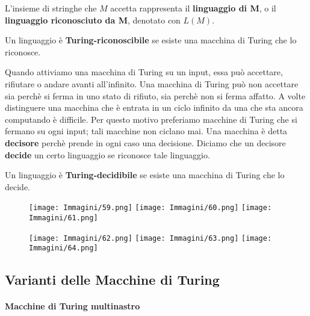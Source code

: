\documentclass{article}
\begin{document}
L'insieme di stringhe che $M$ accetta rappresenta il \textbf{linguaggio di M}, o il \textbf{linguaggio riconosciuto da M}, denotato con $L(M)$.

\begin{tcolorbox}[colback=yellow!10!white, colframe=yellow!50!black, title=Definizione 3.5]
    Un linguaggio è \textbf{Turing-riconoscibile} se esiste una macchina di Turing che lo riconosce.
\end{tcolorbox}

Quando attiviamo una macchina di Turing su un input, essa può accettare, rifiutare o andare avanti all'infinito.
Una macchina di Turing può non accettare sia perchè si ferma in uno stato di rifiuto, sia perchè non si ferma affatto.
A volte distinguere una macchina che è entrata in un ciclo infinito da una che sta ancora computando è difficile.
Per questo motivo preferiamo macchine di Turing che si fermano su ogni input; tali macchine non ciclano mai.
Una macchina è detta \textbf{decisore} perchè prende in ogni caso una decisione.
Diciamo che un decisore \textbf{decide} un certo linguaggio se riconosce tale linguaggio.

\begin{tcolorbox}[colback=green!10!white, colframe=green!50!black, title=Definizione 3.6]
    Un linguaggio è \textbf{Turing-decidibile} se esiste una macchina di Turing che lo decide.
\end{tcolorbox}

\begin{figure}[H]
    \centering
    \texttt{[image: Immagini/59.png]}
    \texttt{[image: Immagini/60.png]}
    \texttt{[image: Immagini/61.png]}
    \label{fig:turing_machine_example2}
\end{figure}


\begin{figure}[H]
    \centering
    \texttt{[image: Immagini/62.png]}
    \texttt{[image: Immagini/63.png]}
    \texttt{[image: Immagini/64.png]}
    \label{fig:turing_machine_example2}
\end{figure}

\subsection{Varianti delle Macchine di Turing}
\paragraph{Macchine di Turing multinastro}
\label{def:multi_turing_machine}
\text{ }
\end{document}
